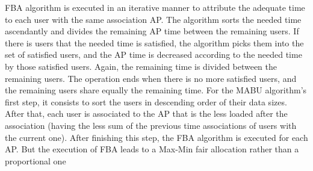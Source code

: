 \documentclass[journal,transmag]{IEEEtran}
\begin{document}
FBA algorithm is executed in an iterative manner to attribute the adequate time to each user with  the same association AP. The algorithm sorts the needed time ascendantly and divides the remaining AP time between the remaining users. If there is users that the needed time is satisfied, the algorithm picks them into the set of satisfied users, and the AP time is decreased according to the needed time by those satisfied users. Again, the remaining time is divided between the remaining users. The operation ends when there is no more satisfied users, and the remaining users share equally the remaining time. For the MABU algorithm's first step, it consists to sort the users in descending order of their data sizes. After that, each user is associated to the AP that is the less loaded after the association (having the less sum of the previous time associations of users with the current one). After finishing this step, the FBA algorithm is executed for each AP. But the execution of FBA leads to a Max-Min fair allocation rather than a proportional one \cite{04Fairness_load_balancing_WLAN} \\    
\end{document}
